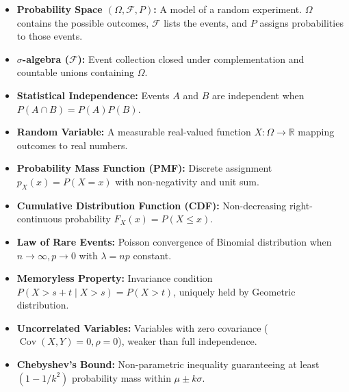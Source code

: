 \documentclass[12pt,a4paper]{article}
\begin{document}
\vspace{1pt}

\begin{tcolorbox}[defbox, title={\textbf{One-Line Definitions}}]
\begin{itemize}[leftmargin=*, itemsep=0.5pt, topsep=0pt]
  \item \textbf{Probability Space $(\Omega, \mathcal{F}, P)$:} A model of a random experiment. $\Omega$ contains the possible outcomes, $\mathcal{F}$ lists the events, and $P$ assigns probabilities to those events.
  \item \textbf{$\sigma$-algebra ($\mathcal{F}$):} Event collection closed under complementation and countable unions containing $\Omega$.
  \item \textbf{Statistical Independence:} Events $A$ and $B$ are independent when $P(A\cap B)=P(A)P(B)$.
  \item \textbf{Random Variable:} A measurable real-valued function $X: \Omega \to \mathbb{R}$ mapping outcomes to real numbers.
  \item \textbf{Probability Mass Function (PMF):} Discrete assignment $p_X(x) = P(X=x)$ with non-negativity and unit sum.
  \item \textbf{Cumulative Distribution Function (CDF):} Non-decreasing right-continuous probability $F_X(x) = P(X \le x)$.
  \item \textbf{Law of Rare Events:} Poisson convergence of Binomial distribution when $n \to \infty, p \to 0$ with $\lambda = np$ constant.
  \item \textbf{Memoryless Property:} Invariance condition $P(X > s+t \mid X > s) = P(X > t)$, uniquely held by Geometric distribution.
  \item \textbf{Uncorrelated Variables:} Variables with zero covariance ($\operatorname{Cov}(X,Y) = 0, \rho = 0$), weaker than full independence.
  \item \textbf{Chebyshev's Bound:} Non-parametric inequality guaranteeing at least $(1 - 1/k^2)$ probability mass within $\mu \pm k\sigma$.
\end{itemize}
\end{tcolorbox}
\end{document}
